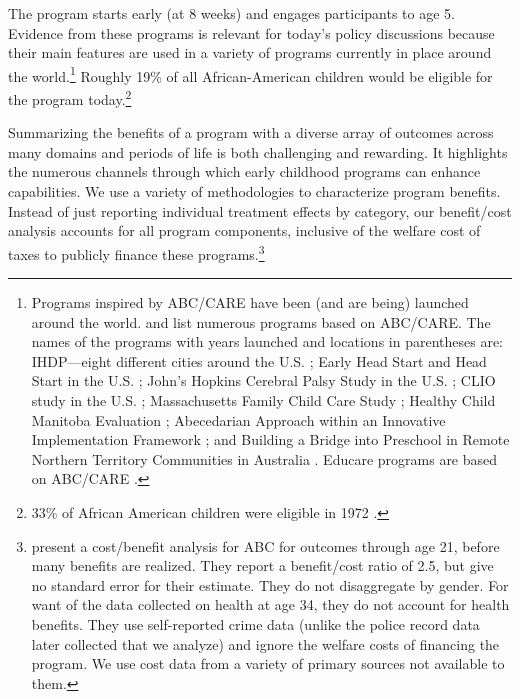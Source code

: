 The program starts early (at 8 weeks) and engages participants to age 5. Evidence from these programs is relevant for today's policy discussions because their main features are used in a variety of programs currently in place around the world.\footnote{Programs inspired by ABC/CARE have been (and are being) launched around the world. \citet{Sparling_2010_Highlights} and \citet{Ramey_Ramey_Lanzi_2014_Interventions} list numerous programs based on ABC/CARE. The names of the programs with years launched and locations in parentheses are: IHDP---eight different cities around the U.S. \citep{Spiker-etal_1997_Helping}; Early Head Start and Head Start in the U.S. \citep{Schneider_McDonald-eds_2007_Scale-Up_Vol-1}; John's Hopkins Cerebral Palsy Study in the U.S. \citep{Sparling_2010_Highlights}; CLIO study in the U.S. \citep{Sparling_2010_Highlights}; Massachusetts Family Child Care Study \citep{Collins_etal_2010_Massachusetts-Study}; Healthy Child Manitoba Evaluation \citep{Healthy_Child_Manitoba_2015_Starting-Early}; Abecedarian Approach within an Innovative Implementation Framework \citep{Jensen_Nielsen_2016_ABC-Programme-Pilot}; and Building a Bridge into Preschool in Remote Northern Territory Communities in Australia \citep{UMonash_Dataset_2015_URL}. Educare programs are based on ABC/CARE \citep{Educare_2014_Research_Agenda,Yazejian_Bryant_2012_Educare}.} Roughly 19\% of all African-American children would be eligible for the program today.\footnote{33\% of African American children were eligible in 1972 \citep{Garcia_2016_National-Implementation-ECI}.}

Summarizing the benefits of a program with a diverse array of outcomes across many domains and periods of life is both challenging and rewarding. It highlights the numerous channels through which early childhood programs can enhance capabilities. We use a variety of methodologies to characterize program benefits. Instead of just reporting individual treatment effects by category, our benefit/cost analysis accounts for all program components, inclusive of the welfare cost of taxes to publicly finance these programs.\footnote{\cite{Barnett_Masse_2002_benefitcost,Barnett_Masse_2007_EER} present a cost/benefit analysis for ABC for outcomes through age 21, before many benefits are realized. They report a benefit/cost ratio of 2.5, but give no standard error for their estimate. They do not disaggregate by gender. For want of the data collected on health at age 34, they do not account for health benefits. They use self-reported crime data (unlike the police record data later collected that we analyze) and ignore the welfare costs of financing the program. We use cost data from a variety of primary sources not available to them.} 

